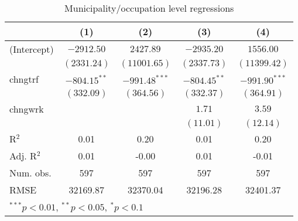 
\begin{table}
\caption{Municipality/occupation level regressions}
\begin{center}
\begin{tabular}{l c c c c }
\hline
 & (1) & (2) & (3) & (4) \\
\hline
(Intercept) & $-2912.50$     & $2427.89$       & $-2935.20$     & $1556.00$       \\
            & $(2331.24)$    & $(11001.65)$    & $(2337.73)$    & $(11399.42)$    \\
chngtrf     & $-804.15^{**}$ & $-991.48^{***}$ & $-804.45^{**}$ & $-991.90^{***}$ \\
            & $(332.09)$     & $(364.56)$      & $(332.37)$     & $(364.91)$      \\
chngwrk     &                &                 & $1.71$         & $3.59$          \\
            &                &                 & $(11.01)$      & $(12.14)$       \\
\hline
R$^2$       & 0.01           & 0.20            & 0.01           & 0.20            \\
Adj. R$^2$  & 0.01           & -0.00           & 0.01           & -0.01           \\
Num. obs.   & 597            & 597             & 597            & 597             \\
RMSE        & 32169.87       & 32370.04        & 32196.28       & 32401.37        \\
\hline
\multicolumn{5}{l}{\scriptsize{$^{***}p<0.01$, $^{**}p<0.05$, $^*p<0.1$}}
\end{tabular}
\label{table:coefficients}
\end{center}
\end{table}
